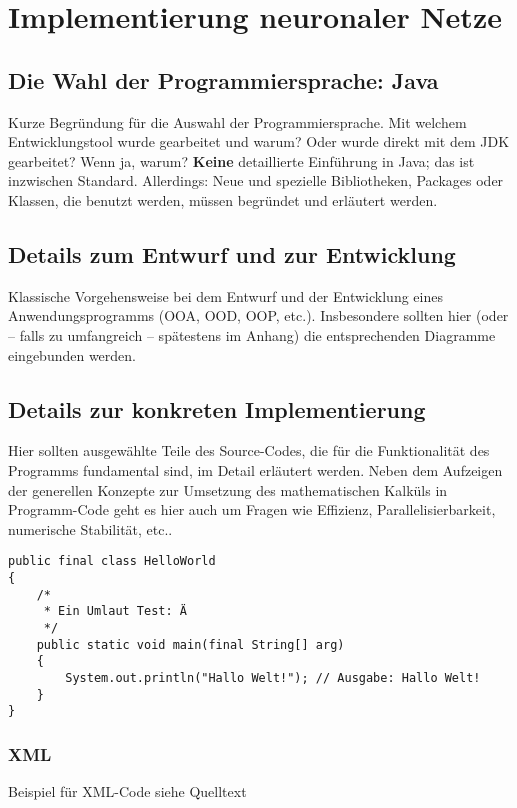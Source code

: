 \chapter{Implementierung neuronaler Netze}
\label{chap:implementierung}

\section{Die Wahl der Programmiersprache: Java}
Kurze Begründung für die Auswahl der Programmiersprache. Mit welchem
Entwicklungstool wurde gearbeitet und warum? Oder wurde direkt mit dem JDK 
gearbeitet? Wenn ja, warum? {\bf Keine} detaillierte
Einführung in Java; das ist inzwischen Standard. Allerdings: Neue und
spezielle Bibliotheken, Packages oder Klassen, die benutzt werden, müssen
begründet und erläutert werden.

\section{Details zum Entwurf und zur Entwicklung}
Klassische Vorgehensweise bei dem Entwurf und der Entwicklung eines
Anwendungsprogramms (OOA, OOD, OOP, etc.). 
Insbesondere sollten hier (oder -- falls zu umfangreich -- spätestens im
Anhang) die entsprechenden Diagramme eingebunden werden.

\section{Details zur konkreten Implementierung}
Hier sollten ausgewählte Teile des Source-Codes, die für die Funktionalität
des Programms fundamental sind, im Detail erläutert werden. Neben dem
Aufzeigen der generellen Konzepte zur Umsetzung des mathematischen Kalküls in
Programm-Code geht es hier auch um Fragen wie Effizienz, Parallelisierbarkeit,
numerische Stabilität, etc.. 

\begin{lstlisting}[firstnumber=1, caption={[Hallo-Welt-Programm (Java)] Ein Hallo-Welt-Programm in der Programmiersprache Java.}, label=lst:hallo_welt, style=java]
public final class HelloWorld
{
    /*
     * Ein Umlaut Test: Ä
     */
	public static void main(final String[] arg)
	{
		System.out.println("Hallo Welt!"); // Ausgabe: Hallo Welt!
	}
}
\end{lstlisting}
\subsection{XML}
Beispiel für XML-Code siehe Quelltext

